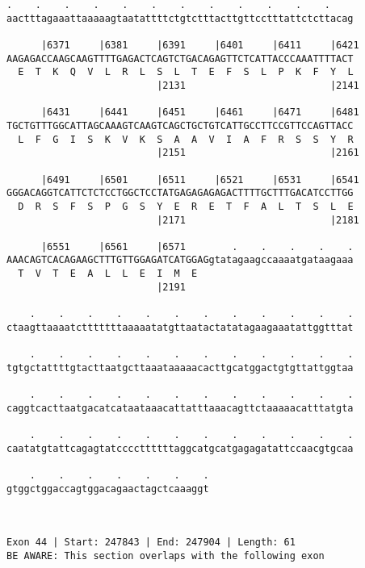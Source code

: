 \documentclass{article}
\begin{document}
\begin{Verbatim}
.    .    .    .    .    .    .    .    .    .    .    .    
aactttagaaattaaaaagtaatattttctgtctttacttgttcctttattctcttacag
                                                            
      |6371     |6381     |6391     |6401     |6411     |6421
AAGAGACCAAGCAAGTTTTGAGACTCAGTCTGACAGAGTTCTCATTACCCAAATTTTACT
  E  T  K  Q  V  L  R  L  S  L  T  E  F  S  L  P  K  F  Y  L
                          |2131                         |2141
  
      |6431     |6441     |6451     |6461     |6471     |6481
TGCTGTTTGGCATTAGCAAAGTCAAGTCAGCTGCTGTCATTGCCTTCCGTTCCAGTTACC
  L  F  G  I  S  K  V  K  S  A  A  V  I  A  F  R  S  S  Y  R
                          |2151                         |2161
  
      |6491     |6501     |6511     |6521     |6531     |6541
GGGACAGGTCATTCTCTCCTGGCTCCTATGAGAGAGAGACTTTTGCTTTGACATCCTTGG
  D  R  S  F  S  P  G  S  Y  E  R  E  T  F  A  L  T  S  L  E
                          |2171                         |2181
  
      |6551     |6561     |6571        .    .    .    .    .
AAACAGTCACAGAAGCTTTGTTGGAGATCATGGAGgtatagaagccaaaatgataagaaa
  T  V  T  E  A  L  L  E  I  M  E                           
                          |2191                             
  
    .    .    .    .    .    .    .    .    .    .    .    .
ctaagttaaaatctttttttaaaaatatgttaatactatatagaagaaatattggtttat
                                                            
    .    .    .    .    .    .    .    .    .    .    .    .
tgtgctattttgtacttaatgcttaaataaaaacacttgcatggactgtgttattggtaa
                                                            
    .    .    .    .    .    .    .    .    .    .    .    .
caggtcacttaatgacatcataataaacattatttaaacagttctaaaaacatttatgta
                                                            
    .    .    .    .    .    .    .    .    .    .    .    .
caatatgtattcagagtatccccttttttaggcatgcatgagagatattccaacgtgcaa
                                                            
    .    .    .    .    .    .    .
gtggctggaccagtggacagaactagctcaaaggt
                                   
                                   
 
Exon 44 | Start: 247843 | End: 247904 | Length: 61
BE AWARE: This section overlaps with the following exon




\end{Verbatim}
\end{document}

